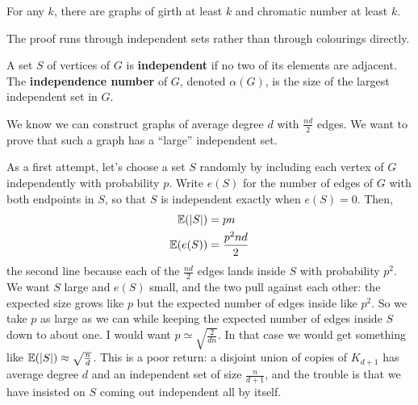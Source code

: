 \begin{boxtheorem}[\Erdos] \label{Ch2:Thm:Erdos_Girth}
    For any $k$, there are graphs of girth at least $k$ and chromatic number at least $k$.
\end{boxtheorem}

The proof runs through independent sets rather than through colourings directly.

\begin{boxdefinition}
    A set $S$ of vertices of $G$ is \textbf{independent} if no two of its elements are adjacent. The \textbf{independence number} of $G$, denoted $\alpha(G)$, is the size of the largest independent set in $G$.
\end{boxdefinition}

We know we can construct graphs of average degree $d$ with $\frac{nd}{2}$ edges. We want to prove that such a graph has a ``large'' independent set.

As a first attempt, let's choose a set $S$ randomly by including each vertex of $G$ independently with probability $p$. Write $e(S)$ for the number of edges of $G$ with both endpoints in $S$, so that $S$ is independent exactly when $e(S) = 0$. Then,
\begin{align*}
    \mathbb{E}\!\left( \left\lvert S \right\rvert \right) &= pn \\
    \mathbb{E}\!\left( e(S) \right) &= \frac{p^2 n d}{2}
\end{align*}
the second line because each of the $\frac{nd}{2}$ edges lands inside $S$ with probability $p^2$. We want $S$ large and $e(S)$ small, and the two pull against each other: the expected size grows like $p$ but the expected number of edges inside like $p^2$. So we take $p$ as large as we can while keeping the expected number of edges inside $S$ down to about one. I would want $p \simeq \sqrt{\frac{2}{dn}}$. In that case we would get something like $\mathbb{E}\!\left( \left\lvert S \right\rvert \right) \approx \sqrt{\frac{n}{d}}$. This is a poor return: a disjoint union of copies of $K_{d + 1}$ has average degree $d$ and an independent set of size $\frac{n}{d + 1}$, and the trouble is that we have insisted on $S$ coming out independent all by itself.

